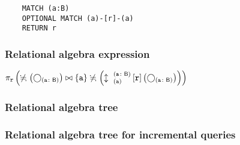 	\begin{lstlisting}
	MATCH (a:B)
	OPTIONAL MATCH (a)-[r]-(a)
	RETURN r
	\end{lstlisting}


	\subsubsection*{Relational algebra expression}

	$\projection{\var{r}} \left(\alldifferent{} \left(\getvertices{a}{B}\right) \join \{\var{a}\} \alldifferent{} \left(\expandboth{a}{a}{B}{r}{} \left(\getvertices{a}{B}\right)\right)\right)$

	\subsubsection*{Relational algebra tree}


	\subsubsection*{Relational algebra tree for incremental queries}

